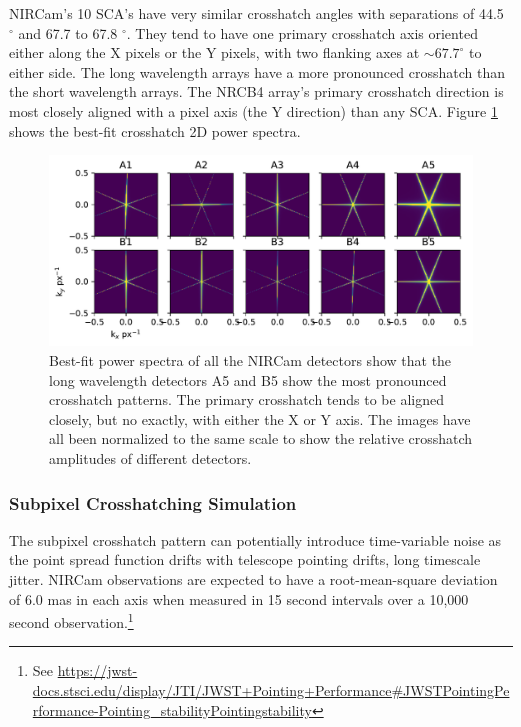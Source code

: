 \documentclass{aastex62}
\newcommand{\degree}{^\circ}
\begin{document}
NIRCam's 10 SCA's have very similar crosshatch angles with separations of 44.5 $\degree$ and 67.7 to 67.8 $\degree$.
They tend to have one primary crosshatch axis oriented either along the X pixels or the Y pixels, with two flanking axes at $\sim 67.7 \degree$ to either side.
The long wavelength arrays have a more pronounced crosshatch than the short wavelength arrays.
The NRCB4 array's primary crosshatch direction is most closely aligned with a pixel axis (the Y direction) than any SCA.
Figure \ref{fig:crosshatchModelGallery} shows the best-fit crosshatch 2D power spectra.

\begin{figure}[!hbtp]
\centering
\includegraphics[width=.99\columnwidth]{psd_models_gallery.pdf}
\caption{
Best-fit power spectra of all the NIRCam detectors show that the long wavelength detectors A5 and B5 show the most pronounced crosshatch patterns.
The primary crosshatch tends to be aligned closely, but no exactly, with either the X or Y axis.
The images have all been normalized to the same scale to show the relative crosshatch amplitudes of different detectors.
}\label{fig:crosshatchModelGallery}
\end{figure}

\subsubsection{Subpixel Crosshatching Simulation}\label{sec:CrosshatchSim}

The subpixel crosshatch pattern can potentially introduce time-variable noise as the point spread function drifts with telescope pointing drifts, long timescale jitter.
NIRCam observations are expected to have a root-mean-square deviation of 6.0 mas in each axis when measured in 15 second intervals over a 10,000 second observation.\footnote{See \url{https://jwst-docs.stsci.edu/display/JTI/JWST+Pointing+Performance\#JWSTPointingPerformance-Pointing\_stabilityPointingstability}}
\end{document}

